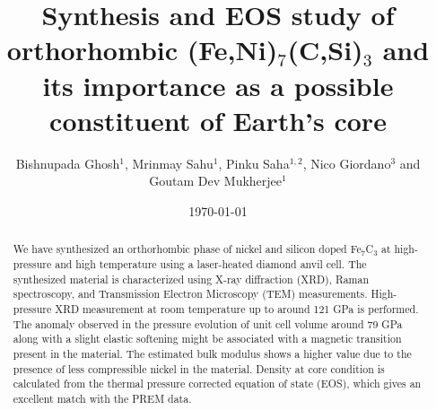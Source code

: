 \documentclass[prb,aps,preprint]{revtex4-2}
\begin{document}
\title{Synthesis and EOS study of orthorhombic (Fe,Ni)$_{7}$(C,Si)$_{3}$ and its importance as a possible constituent of Earth's core}

\author{Bishnupada Ghosh$^1$,  Mrinmay Sahu$^1$, Pinku Saha$^{1,2}$, Nico Giordano$^3$ and Goutam Dev Mukherjee$^1$ }

\address{$^1$ Department of Physical Sciences, Indian Institute of Science Education and Research Kolkata, Mohanpur Campus, Mohanpur 741246, Nadia, West Bengal, India.}
\address{$^2$ Department of Earth Sciences, ETH Zürich, Zurich 8092, Switzerland.}
\address{$^3$ Photon Science, Deutsches Elektronen Synchrotron, Hamburg, Germany.}
\begin{abstract}
 We have synthesized an orthorhombic phase of nickel and silicon doped Fe$_{7}$C$_{3}$ at high-pressure and high temperature using a laser-heated diamond anvil cell. The synthesized material is characterized using X-ray diffraction (XRD), Raman spectroscopy, and Transmission Electron Microscopy (TEM) measurements. High-pressure XRD measurement at room temperature up to around 121 GPa is performed. The anomaly observed in the pressure evolution of unit cell volume around 79 GPa along with a slight elastic softening might be associated with a magnetic transition present in the material. The estimated bulk modulus shows a higher value due to the presence of less compressible nickel in the material. Density at core condition is calculated from the thermal pressure corrected equation of state (EOS), which gives an excellent match with the PREM data.   
\end{abstract}

\date{\today}
\maketitle
\end{document}
